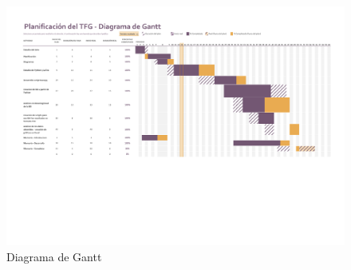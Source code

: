 %	

\begin{figure}[h]
	\centering
	\includegraphics[scale=.6]{capitulos/Gantt1.pdf}
	\caption{Diagrama de Gantt}
	\label{fig:gantt}
\end{figure}
















